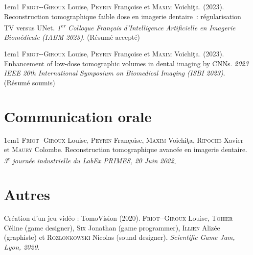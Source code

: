 \begin{hangparas}{1em}{1}
\textsc{Friot-{}-Giroux} Louise, \textsc{Peyrin} Françoise et \textsc{Maxim} Voichi\c {t}a. (2023). Reconstruction tomographique faible dose en imagerie dentaire~: régularisation TV versus UNet. \textit{1\textsuperscript{er} Colloque Français d'Intelligence Artificielle en Imagerie Biomédicale (IABM 2023)}. (Résumé accepté)
\end{hangparas}
\vspace{1em}

\begin{hangparas}{1em}{1}
\textsc{Friot-{}-Giroux} Louise, \textsc{Peyrin} Françoise et \textsc{Maxim} Voichi\c {t}a. (2023). Enhancement of low-dose tomographic volumes in dental imaging by CNNs. \textit{2023 IEEE 20th International Symposium on Biomedical Imaging (ISBI 2023)}. (Résumé soumis)
\end{hangparas}
\vspace{1em}

\vfill

\section*{Communication orale}

\begin{hangparas}{1em}{1}
\textsc{Friot-{}-Giroux} Louise, \textsc{Peyrin} Françoise, \textsc{Maxim} Voichi\c {t}a, \textsc{Ripoche} Xavier et \textsc{Maury} Colombe. Reconstruction tomographique avancée en imagerie dentaire. \textit{3\textsuperscript{e} journée industrielle du LabEx PRIMES, 20 Juin 2022}. %
\end{hangparas}
\vspace{1em}


\vfill


\section*{Autres}

\noindent Création d'un jeu vidéo : TomoVision (2020). \textsc{Friot-{}-Giroux} Louise, \textsc{Tohier} Céline (game designer), \textsc{Six} Jonathan (game programmer), \textsc{Illien} Alizée (graphiste) et \textsc{Rozlonkowski} Nicolas (sound designer). \textit{Scientific Game Jam, Lyon, 2020.}%


\vfill



